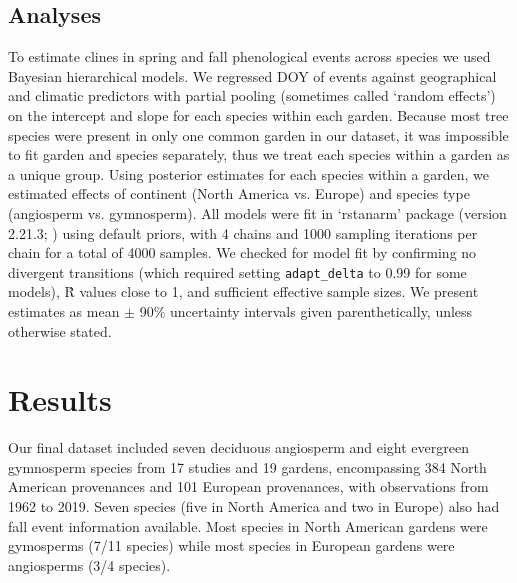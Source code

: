 \documentclass{article}
\begin{document}
\subsection{Analyses}
To estimate clines in spring and fall phenological events across species we used Bayesian hierarchical models. We regressed DOY of events against geographical and climatic predictors with partial pooling (sometimes called `random effects') on the intercept and slope for each species within each garden. Because most tree species were present in only one common garden in our dataset, it was impossible to fit garden and species separately, thus we treat each species within a garden as a unique group. Using posterior estimates for each species within a garden, we estimated effects of continent (North America vs. Europe) and species type (angiosperm vs. gymnosperm). All models were fit in `rstanarm' package (version 2.21.3; \citealp{brilleman2018}) using default priors, with 4 chains and 1000 sampling iterations per chain for a total of 4000 samples. We checked for model fit by confirming no divergent transitions (which required setting \texttt{adapt\_delta} to 0.99 for some models), \^{R} values close to 1, and sufficient effective sample sizes. We present estimates as mean $\pm$ 90\% uncertainty intervals given parenthetically, unless otherwise stated. 


\section{Results}
Our final dataset included seven deciduous angiosperm and eight evergreen gymnosperm species from 17 studies and 19 gardens, encompassing 384 North American provenances and 101 European provenances, with observations from 1962 to 2019. Seven species (five in North America and two in Europe) also had fall event information available. Most species in North American gardens were gymosperms (7/11 species) while most species in European gardens were angiosperms (3/4 species).  
\end{document}
